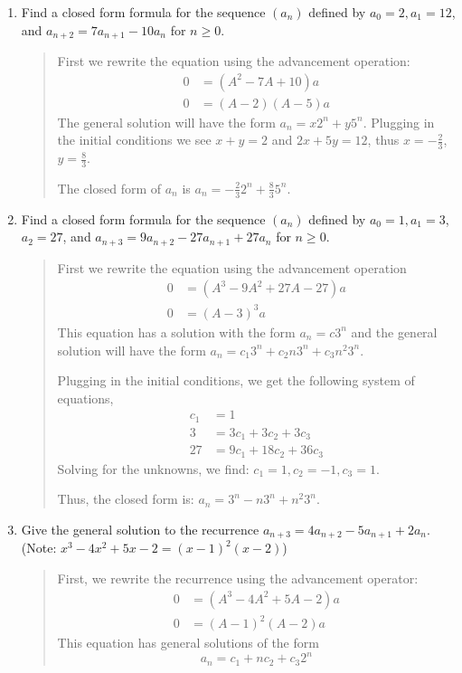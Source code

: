 \documentclass[letter]{article}
\newcommand{\setheader}[6]{
	\lhead{{\sc #1}\\{\sc #2} ({\small \it \today})}
	\rhead{
		{\bf #3} 
		\ifthenelse{\equal{#4}{}}{}{(#4)}\\
		{\bf #5} 
		\ifthenelse{\equal{#6}{}}{}{(#6)}%
	}
}
\begin{document}
	\setheader{MAT344}{Homework 9}{Luke Pereira}{ }{}{}
	\begin{enumerate}
		\item 
		Find a closed form formula for the sequence $(a_n)$ defined by $a_0 = 2, a_1 = 12$, and $a_{n+2} = 7 a_{n+1} - 10a_n$ for $n \geq 0$.
		\begin{quote}
		    First we rewrite the equation using the advancement operation: 
		    \begin{align*}
		            0 &= (A^2 - 7A + 10)a  \\
		            0 &= (A - 2) (A - 5)a  
		    \end{align*} 
		    The general solution will have the form $a_n = x2^n + y 5^n$. Plugging in the initial conditions we see $x + y = 2$ and $2x + 5y = 12$, thus $x = -\frac{2}{3}$, $y = \frac{8}{3}$.
		    
		    The closed form of $a_n$ is $a_n = -\frac{2}{3}2^n + \frac{8}{3}5^n$.
		\end{quote}
        
        \newpage
        \item 
        Find a closed form formula for the sequence $(a_n)$ defined by $a_0 = 1, a_1 = 3$, $a_2 = 27$, and $a_{n+3} = 9a_{n+2} - 27a_{n+1} + 27a_n$ for $n \geq 0$.
		\begin{quote}
		    First we rewrite the equation using the advancement operation 
		    \begin{align*}
		        0 &= (A^3 -9A^2 +27A -27)a \\
		        0 &= (A-3)^3 a
		    \end{align*}
		    This equation has a solution with the form $a_n = c3^n$ and the general solution will have the form $a_n = c_1 3^n + c_2 n3^n + c_3 n^2 3^n$.
		    
		    Plugging in the initial conditions, we get the following system of equations, 
		        \begin{align*}
		            c_1 &= 1\\
		            3 &= 3c_1 + 3c_2 + 3c_3\\
		            27 &= 9c_1 + 18c_2 + 36c_3
		        \end{align*}
            Solving for the unknowns, we find: $c_1 = 1, c_2 = -1, c_3 = 1$.
		    
		    Thus, the closed form is: $a_n =  3^n - n3^n + n^2 3^n$.
		\end{quote}
		
		\newpage
        \item
        Give the general solution to the recurrence $a_{n+3} = 4a_{n+2} - 5a_{n+1} + 2a_n$. (Note: $x^3 - 4x^2 + 5x - 2 = (x - 1)^2(x - 2)$)
		\begin{quote}
		    First, we rewrite the recurrence using the advancement operator:
		    \begin{align*}
		        0 &= (A^3 - 4A^2 + 5A - 2)a\\
		        0 &= (A - 1)^2(A - 2)a
		    \end{align*}
		    This equation has general solutions of the form 
		    \[
    		    a_n = c_1 + n c_2 +  c_3 2^n
		    \]
		\end{quote}
		

\end{enumerate}
\end{document}
